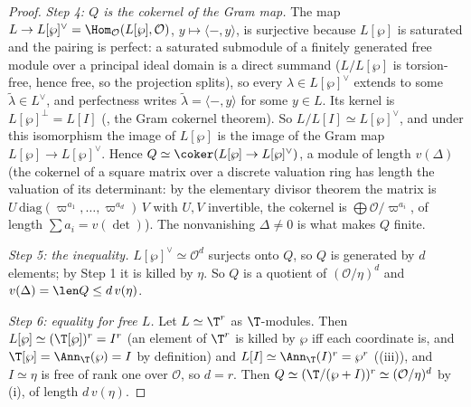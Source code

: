 \begin{proof}
\emph{Step 4: $Q$ is the cokernel of the Gram map.} The map $L\to L[\wp]^\vee=\Hom_{\mathcal O}(L[\wp],\mathcal O)$, $y\mapsto\langle-,y\rangle$, is surjective because $L[\wp]$ is saturated and the
pairing is perfect: a saturated submodule of a finitely generated free module over a principal ideal domain is a direct summand ($L/L[\wp]$ is torsion-free, hence free, so the
projection splits), so every $\lambda\in L[\wp]^\vee$ extends to some $\tilde\lambda\in L^\vee$, and perfectness writes $\tilde\lambda=\langle-,y\rangle$ for some $y\in L$. Its kernel is $L[\wp]^\perp=L[I]$ (, the Gram cokernel theorem). So $L/L[I]\simeq L[\wp]^\vee$, and under this isomorphism the image of $L[\wp]$
is the image of the Gram map $L[\wp]\to L[\wp]^\vee$. Hence $Q\simeq\coker(L[\wp]\to L[\wp]^\vee)$, a module of length $v(\Delta)$ (the cokernel of a square matrix over a discrete
valuation ring has length the valuation of its determinant: by the elementary divisor theorem the matrix is $U\,\mathrm{diag}(\varpi^{a_1},\dots,\varpi^{a_d})\,V$ with $U,V$ invertible, the cokernel is
$\bigoplus\mathcal O/\varpi^{a_i}$, of length $\sum a_i=v(\det)$). The nonvanishing $\Delta\ne0$ is what makes $Q$ finite.

\emph{Step 5: the inequality.} $L[\wp]^\vee\simeq\mathcal O^d$ surjects onto $Q$, so $Q$ is generated by $d$ elements; by Step 1 it is killed by $\eta$. So $Q$ is a quotient of $(\mathcal O/\eta)^d$
and $v(\Delta)=\len Q\le d\,v(\eta)$.

\emph{Step 6: equality for free $L$.} Let $L\simeq\T^r$ as $\T$-modules. Then $L[\wp]\simeq(\T[\wp])^r=I^r$ (an element of $\T^r$ is killed by $\wp$ iff each coordinate is, and
$\T[\wp]=\Ann_\T(\wp)=I$ by definition) and $L[I]\simeq\Ann_\T(I)^r=\wp^r$ ((iii)), and
$I\simeq\eta$ is free of rank one over $\mathcal O$, so $d=r$. Then $Q\simeq(\T/(\wp+I))^r\simeq(\mathcal O/\eta)^d$ by (i), of length $d\,v(\eta)$.
\end{proof}

